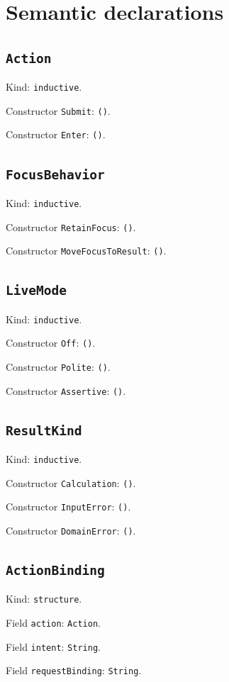 \documentclass[11pt]{article}
\begin{document}
\section*{Semantic declarations}
\subsection*{\texttt{Action}}
\noindent Kind: \texttt{inductive}.\par
\noindent Constructor \texttt{Submit}: \texttt{()}.\par
\noindent Constructor \texttt{Enter}: \texttt{()}.\par
\subsection*{\texttt{FocusBehavior}}
\noindent Kind: \texttt{inductive}.\par
\noindent Constructor \texttt{RetainFocus}: \texttt{()}.\par
\noindent Constructor \texttt{MoveFocusToResult}: \texttt{()}.\par
\subsection*{\texttt{LiveMode}}
\noindent Kind: \texttt{inductive}.\par
\noindent Constructor \texttt{Off}: \texttt{()}.\par
\noindent Constructor \texttt{Polite}: \texttt{()}.\par
\noindent Constructor \texttt{Assertive}: \texttt{()}.\par
\subsection*{\texttt{ResultKind}}
\noindent Kind: \texttt{inductive}.\par
\noindent Constructor \texttt{Calculation}: \texttt{()}.\par
\noindent Constructor \texttt{InputError}: \texttt{()}.\par
\noindent Constructor \texttt{DomainError}: \texttt{()}.\par
\subsection*{\texttt{ActionBinding}}
\noindent Kind: \texttt{structure}.\par
\noindent Field \texttt{action}: \texttt{Action}.\par
\noindent Field \texttt{intent}: \texttt{String}.\par
\noindent Field \texttt{requestBinding}: \texttt{String}.\par
\end{document}
